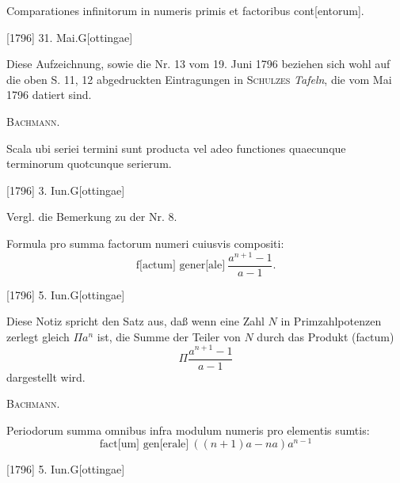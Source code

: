 \indent Comparationes infinitorum in numeris primis et factoribus cont[entorum].
\par\noindent\hfill[1796] 31. Mai.\quad G[ottingae]

\medskip\begingroup\small
\indent Diese Aufzeichnung, sowie die Nr. 13 vom 19. Juni 1796 beziehen sich wohl auf die oben S. 11, 12 abgedruckten Eintragungen in \textsc{Schulzes} \textit{Tafeln}, die vom Mai 1796 datiert sind.
\par\noindent\hfill\textsc{Bachmann}.
\par\endgroup

\clearpage{}
\indent Scala ubi seriei termini sunt producta vel adeo functiones quaecunque terminorum quotcunque serierum.
\par\noindent\hfill[1796] 3. Iun.\quad G[ottingae]
\par\medskip\begingroup\small
\indent Vergl. die Bemerkung zu der Nr. 8.
\par\endgroup

\indent Formula pro summa factorum numeri cuiusvis compositi:
\[
\text{f[actum] gener[ale]}\ \frac{a^{n+1}-1}{a-1}.
\]
\par\noindent\hfill[1796] 5. Iun.\quad G[ottingae]

\medskip\begingroup\small
\indent Diese Notiz spricht den Satz aus, daß wenn eine Zahl \(N\) in Primzahlpotenzen zerlegt gleich \(\Pi a^n\) ist, die Summe der Teiler von \(N\) durch das Produkt (factum)
\[
\Pi\frac{a^{n+1}-1}{a-1}
\]
\noindent dargestellt wird.
\par\noindent\hfill\textsc{Bachmann}.
\par\endgroup

\indent Periodorum summa omnibus infra modulum numeris pro elementis sumtis:
\[
\text{fact[um] gen[erale]}\ ((n+1)a-na)a^{n-1}
\]
\par\noindent\hfill[1796] 5. Iun.\quad G[ottingae]

